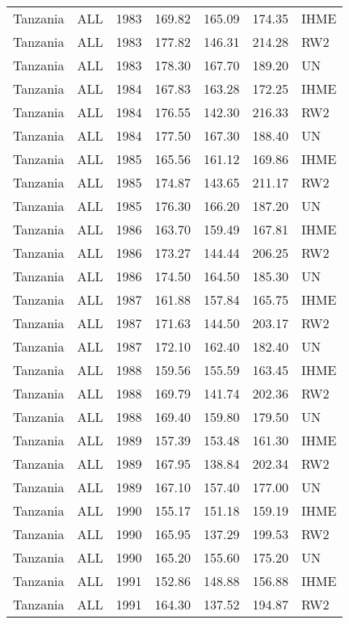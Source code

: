 \begin{longtable}{lllrrrl}
  Tanzania & ALL & 1983 & 169.82 & 165.09 & 174.35 & IHME \\ 
  Tanzania & ALL & 1983 & 177.82 & 146.31 & 214.28 & RW2 \\ 
  Tanzania & ALL & 1983 & 178.30 & 167.70 & 189.20 & UN \\ 
  Tanzania & ALL & 1984 & 167.83 & 163.28 & 172.25 & IHME \\ 
  Tanzania & ALL & 1984 & 176.55 & 142.30 & 216.33 & RW2 \\ 
  Tanzania & ALL & 1984 & 177.50 & 167.30 & 188.40 & UN \\ 
  Tanzania & ALL & 1985 & 165.56 & 161.12 & 169.86 & IHME \\ 
  Tanzania & ALL & 1985 & 174.87 & 143.65 & 211.17 & RW2 \\ 
  Tanzania & ALL & 1985 & 176.30 & 166.20 & 187.20 & UN \\ 
  Tanzania & ALL & 1986 & 163.70 & 159.49 & 167.81 & IHME \\ 
  Tanzania & ALL & 1986 & 173.27 & 144.44 & 206.25 & RW2 \\ 
  Tanzania & ALL & 1986 & 174.50 & 164.50 & 185.30 & UN \\ 
  Tanzania & ALL & 1987 & 161.88 & 157.84 & 165.75 & IHME \\ 
  Tanzania & ALL & 1987 & 171.63 & 144.50 & 203.17 & RW2 \\ 
  Tanzania & ALL & 1987 & 172.10 & 162.40 & 182.40 & UN \\ 
  Tanzania & ALL & 1988 & 159.56 & 155.59 & 163.45 & IHME \\ 
  Tanzania & ALL & 1988 & 169.79 & 141.74 & 202.36 & RW2 \\ 
  Tanzania & ALL & 1988 & 169.40 & 159.80 & 179.50 & UN \\ 
  Tanzania & ALL & 1989 & 157.39 & 153.48 & 161.30 & IHME \\ 
  Tanzania & ALL & 1989 & 167.95 & 138.84 & 202.34 & RW2 \\ 
  Tanzania & ALL & 1989 & 167.10 & 157.40 & 177.00 & UN \\ 
  Tanzania & ALL & 1990 & 155.17 & 151.18 & 159.19 & IHME \\ 
  Tanzania & ALL & 1990 & 165.95 & 137.29 & 199.53 & RW2 \\ 
  Tanzania & ALL & 1990 & 165.20 & 155.60 & 175.20 & UN \\ 
  Tanzania & ALL & 1991 & 152.86 & 148.88 & 156.88 & IHME \\ 
  Tanzania & ALL & 1991 & 164.30 & 137.52 & 194.87 & RW2 \\ 

\end{longtable}
